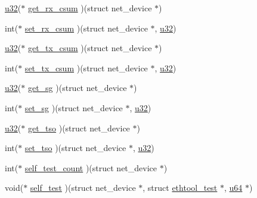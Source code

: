 \begin{DoxyCompactItemize}
\item 
\hyperlink{lib_2igb_2e1000__osdep_8h_a64e91c10a0d8fb627e92932050284264}{u32}($\ast$ \hyperlink{struct__kc__ethtool__ops_ad38c4d23836bd0d1916789d25ccddfef}{get\+\_\+rx\+\_\+csum} )(struct net\+\_\+device $\ast$)
\item 
int($\ast$ \hyperlink{struct__kc__ethtool__ops_aca19dbed7f61812282c99df2a67d04d4}{set\+\_\+rx\+\_\+csum} )(struct net\+\_\+device $\ast$, \hyperlink{lib_2igb_2e1000__osdep_8h_a64e91c10a0d8fb627e92932050284264}{u32})
\item 
\hyperlink{lib_2igb_2e1000__osdep_8h_a64e91c10a0d8fb627e92932050284264}{u32}($\ast$ \hyperlink{struct__kc__ethtool__ops_aff9d1a68d0b5f9f0c90ad732ceb1e46b}{get\+\_\+tx\+\_\+csum} )(struct net\+\_\+device $\ast$)
\item 
int($\ast$ \hyperlink{struct__kc__ethtool__ops_a6083971e2f5e3a37161264d7732e4bb2}{set\+\_\+tx\+\_\+csum} )(struct net\+\_\+device $\ast$, \hyperlink{lib_2igb_2e1000__osdep_8h_a64e91c10a0d8fb627e92932050284264}{u32})
\item 
\hyperlink{lib_2igb_2e1000__osdep_8h_a64e91c10a0d8fb627e92932050284264}{u32}($\ast$ \hyperlink{struct__kc__ethtool__ops_a640ee9efaccd8f7fa3e6db7da4e8e75f}{get\+\_\+sg} )(struct net\+\_\+device $\ast$)
\item 
int($\ast$ \hyperlink{struct__kc__ethtool__ops_a017b7a4a581bf4b6a271848c27f409e5}{set\+\_\+sg} )(struct net\+\_\+device $\ast$, \hyperlink{lib_2igb_2e1000__osdep_8h_a64e91c10a0d8fb627e92932050284264}{u32})
\item 
\hyperlink{lib_2igb_2e1000__osdep_8h_a64e91c10a0d8fb627e92932050284264}{u32}($\ast$ \hyperlink{struct__kc__ethtool__ops_a553b9599a3f9fff1f4081070f7d4e504}{get\+\_\+tso} )(struct net\+\_\+device $\ast$)
\item 
int($\ast$ \hyperlink{struct__kc__ethtool__ops_ace21bc045c02d1abf1423f1b1176e985}{set\+\_\+tso} )(struct net\+\_\+device $\ast$, \hyperlink{lib_2igb_2e1000__osdep_8h_a64e91c10a0d8fb627e92932050284264}{u32})
\item 
int($\ast$ \hyperlink{struct__kc__ethtool__ops_ade1b8c5a494838143165b79165636358}{self\+\_\+test\+\_\+count} )(struct net\+\_\+device $\ast$)
\item 
void($\ast$ \hyperlink{struct__kc__ethtool__ops_aaa2de6dc773a12b69d68de05af4d6443}{self\+\_\+test} )(struct net\+\_\+device $\ast$, struct \hyperlink{structethtool__test}{ethtool\+\_\+test} $\ast$, \hyperlink{lib_2igb_2e1000__osdep_8h_a1d8f78f95a414480659f3182e6067b80}{u64} $\ast$)
\item 

\end{DoxyCompactItemize}

